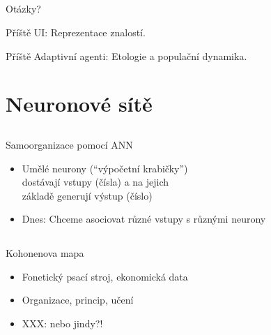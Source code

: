 \documentclass{beamer}
\begin{document}
\subsection{}
\begin{frame}{Otázky?}
\begin{center}
Příště UI: Reprezentace znalostí.

Příště Adaptivní agenti: Etologie a populační dynamika.
\end{center}
\end{frame}

\section{Neuronové sítě}

\subsection{}
\begin{frame}{Samoorganizace pomocí ANN}
\begin{itemize}
\item Umělé neurony (``výpočetní krabičky'') \\ dostávají vstupy (čísla) a na jejich \\ základě generují výstup (číslo)
\item Dnes: Chceme asociovat různé vstupy s různými neurony
\end{itemize}
\end{frame}

\subsection{}
\begin{frame}{Kohonenova mapa}
\begin{itemize}
\item Fonetický psací stroj, ekonomická data
\item Organizace, princip, učení
\item XXX: nebo jindy?!
\end{itemize}
\end{frame}
\end{document}

